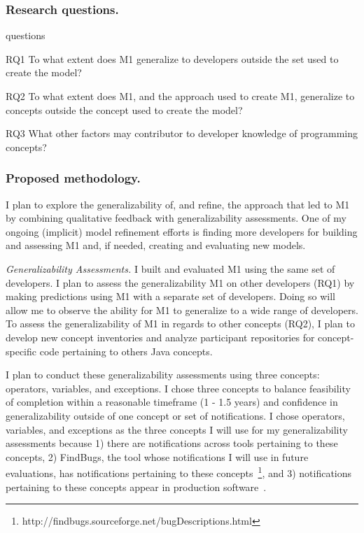 \documentclass{llncs}
\begin{document}
\subsubsection{Research questions.}

\begin{labeling}{questions}
	\item [RQ1] To what extent does M1 generalize to developers outside the set used to create the model?
	\item [RQ2] To what extent does M1, and the approach used to create M1, generalize to concepts outside the concept used to create the model?
	\item [RQ3] What other factors may contributor to developer knowledge of programming concepts?
\end{labeling}

\subsubsection{Proposed methodology.}
I plan to explore the generalizability of, and refine, the approach that led to M1 by combining qualitative feedback with generalizability assessments. One of my ongoing (implicit) model refinement efforts is finding more developers for building and assessing M1 and, if needed, creating and evaluating new models.

\vspace{0.5em}
\noindent\textit{Generalizability Assessments.}
I built and evaluated M1 using the same set of developers. I plan to assess the generalizability M1 on other developers (RQ1) by making predictions using M1 with a separate set of developers. Doing so will allow me to observe the ability for M1 to generalize to a wide range of developers. 
To assess the generalizability of M1 in regards to other concepts (RQ2), I plan to develop new concept inventories and analyze participant repositories for concept-specific code pertaining to others Java concepts.

I plan to conduct these generalizability assessments using three concepts: operators, variables, and exceptions.
I chose three concepts to balance feasibility of completion within a reasonable timeframe (1 - 1.5 years) and confidence in generalizability outside of one concept or set of notifications.
I chose operators, variables, and exceptions as the three concepts I will use for my generalizability assessments because 1) there are notifications across tools pertaining to these concepts, 2) FindBugs, the tool whose notifications I will use in future evaluations, has notifications pertaining to these concepts~\footnote{http://findbugs.sourceforge.net/bugDescriptions.html}, and 3) notifications pertaining to these concepts appear in production software~\cite{ayewah2007evaluating}.
\end{document}
